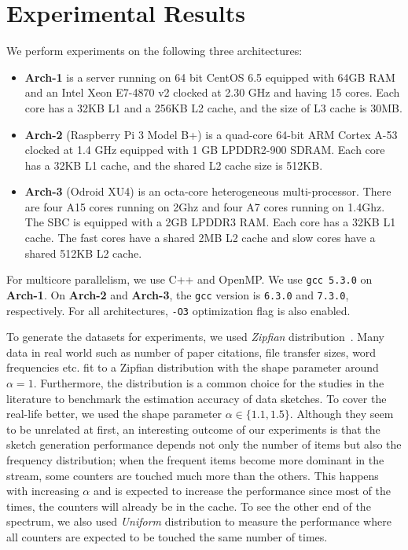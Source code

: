 \documentclass[runningheads]{llncs}
\begin{document}
\section{Experimental Results}\label{sec:exp}

We perform experiments on the following three architectures: 
\begin{itemize}[leftmargin=*]
\item {\bf Arch-1} is a server running on 64 bit CentOS 6.5 equipped with 64GB RAM and an Intel Xeon E7-4870 v2 clocked at 2.30 GHz and having 15 cores. Each core has a 32KB L1 and a 256KB L2 cache, and the size of L3 cache is 30MB. 
\item {\bf Arch-2} (Raspberry Pi 3 Model B+) is a quad-core 64-bit ARM Cortex A-53 clocked at 1.4 GHz equipped with 1 GB LPDDR2-900 SDRAM.  Each core has a 32KB L1 cache, and the shared L2 cache size is 512KB.
\item {\bf Arch-3} (Odroid XU4) is an octa-core heterogeneous multi-processor. There are four A15 cores running on 2Ghz and four A7 cores running on 1.4Ghz. The SBC is equipped with a 2GB LPDDR3 RAM. Each core has a 32KB L1 cache. The fast cores have a shared 2MB L2 cache and slow cores have a shared 512KB L2 cache. 
\end{itemize}
For  multicore parallelism, we use C++ and OpenMP. We use {\tt gcc 5.3.0} on {\bf Arch-1}. On {\bf Arch-2} and  {\bf Arch-3}, the {\tt gcc} version is {\tt 6.3.0} and {\tt 7.3.0}, respectively. For all architectures, {\tt -O3} optimization flag is also enabled.

To generate the datasets for experiments, we used {\em Zipfian} distribution~\cite{Zipf1935}. Many data in real world such as number of paper citations, file transfer sizes, word frequencies etc. fit to a Zipfian distribution with the shape parameter around $\alpha = 1$. Furthermore, the distribution is a common choice for the studies in the literature to benchmark the estimation accuracy of data sketches. To cover the real-life better, we used the shape parameter $\alpha \in \{1.1, 1.5\}$. Although they seem to be unrelated at first, an interesting outcome of our experiments is that the sketch generation performance depends not only the number of items but also the frequency distribution; when 
the frequent items become more dominant in the stream, some counters are touched much more than the others. This happens with increasing $\alpha$ and is expected to increase the performance since most of the times, the counters will already be in the cache. To see the other end of the spectrum, we also used {\em Uniform} distribution to measure the performance where all counters are expected to be touched the same number of times. 
\end{document}
